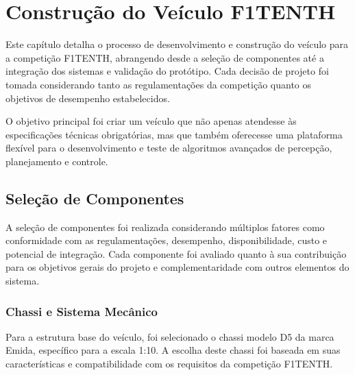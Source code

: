 \chapter{Construção do Veículo F1TENTH}

Este capítulo detalha o processo de desenvolvimento e construção do veículo
para a competição F1TENTH, abrangendo desde a seleção de componentes até a
integração dos sistemas e validação do protótipo. Cada decisão de projeto foi
tomada considerando tanto as regulamentações da competição quanto os objetivos
de desempenho estabelecidos.

O objetivo principal foi criar um veículo que não apenas atendesse às
especificações técnicas obrigatórias, mas que também oferecesse uma plataforma
flexível para o desenvolvimento e teste de algoritmos avançados de percepção,
planejamento e controle.

\section{Seleção de Componentes}

A seleção de componentes foi realizada considerando múltiplos fatores como
conformidade com as regulamentações, desempenho, disponibilidade, custo e
potencial de integração. Cada componente foi avaliado quanto à sua contribuição
para os objetivos gerais do projeto e complementaridade com outros elementos do
sistema.

\subsection{Chassi e Sistema Mecânico}

Para a estrutura base do veículo, foi selecionado o chassi modelo D5 da marca
Emida, específico para a escala 1:10. A escolha deste chassi foi baseada em
suas características e compatibilidade com os requisitos da competição F1TENTH.

